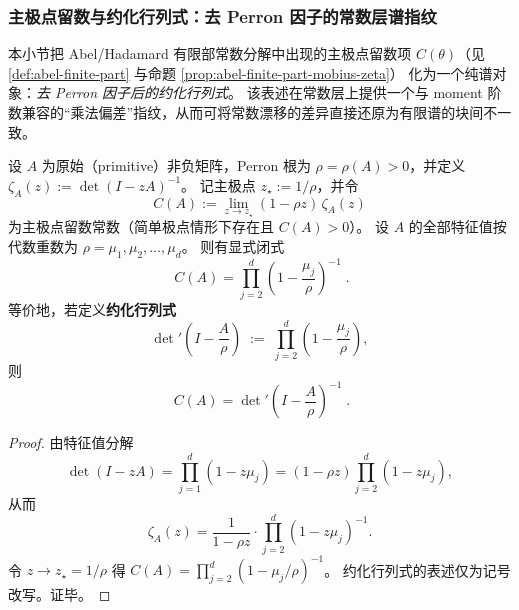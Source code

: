 \subsubsection{主极点留数与约化行列式：去 Perron 因子的常数层谱指纹}\label{subsec:finite-part-reduced-determinant-residue}
本小节把 Abel/Hadamard 有限部常数分解中出现的主极点留数项 \(C(\theta)\)（见 \ref{def:abel-finite-part} 与命题 \ref{prop:abel-finite-part-mobius-zeta}）
化为一个纯谱对象：\emph{去 Perron 因子后的约化行列式}。
该表述在常数层上提供一个与 moment 阶数兼容的“乘法偏差”指纹，从而可将常数漂移的差异直接还原为有限谱的块间不一致。

\begin{proposition}[主极点留数的谱乘积公式]\label{prop:finite-part-residue-reduced-determinant}
设 \(A\) 为原始（primitive）非负矩阵，Perron 根为 \(\rho=\rho(A)>0\)，并定义
\(
\zeta_A(z):=\det(I-zA)^{-1}
\)。
记主极点 \(z_\star:=1/\rho\)，并令
\[
C(A):=\lim_{z\to z_\star}(1-\rho z)\,\zeta_A(z)
\]
为主极点留数常数（简单极点情形下存在且 \(C(A)>0\)）。
设 \(A\) 的全部特征值按代数重数为 \(\rho=\mu_1,\mu_2,\dots,\mu_d\)。
则有显式闭式
\[
\boxed{\;
C(A)=\prod_{j=2}^{d}\left(1-\frac{\mu_j}{\rho}\right)^{-1}\; }.
\]
等价地，若定义\textbf{约化行列式}
\[
\det\nolimits'\!\left(I-\frac{A}{\rho}\right)
\;:=\;
\prod_{j=2}^{d}\left(1-\frac{\mu_j}{\rho}\right),
\]
则
\[
\boxed{\;
C(A)=\det\nolimits'\!\left(I-\frac{A}{\rho}\right)^{-1}\; }.
\]
\end{proposition}
\begin{proof}
由特征值分解
\[
\det(I-zA)=\prod_{j=1}^{d}(1-z\mu_j)=(1-\rho z)\prod_{j=2}^{d}(1-z\mu_j),
\]
从而
\[
\zeta_A(z)=\frac{1}{1-\rho z}\cdot \prod_{j=2}^{d}(1-z\mu_j)^{-1}.
\]
令 \(z\to z_\star=1/\rho\) 得
\(
C(A)=\prod_{j=2}^{d}(1-\mu_j/\rho)^{-1}
\)。
约化行列式的表述仅为记号改写。证毕。
\end{proof}

